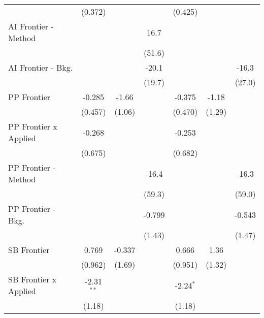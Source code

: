 \begin{tabular}{lcccccc}
                                & (0.372)        &              &              & (0.425)        &              &   \\   
   AI Frontier - Method         &                &              & 16.7         &                &              &   \\   
                                &                &              & (51.6)       &                &              &   \\   
   AI Frontier - Bkg.           &                &              & -20.1        &                &              & -16.3\\   
                                &                &              & (19.7)       &                &              & (27.0)\\   
   PP Frontier                  & -0.285         & -1.66        &              & -0.375         & -1.18        &   \\   
                                & (0.457)        & (1.06)       &              & (0.470)        & (1.29)       &   \\   
   PP Frontier x Applied        & -0.268         &              &              & -0.253         &              &   \\   
                                & (0.675)        &              &              & (0.682)        &              &   \\   
   PP Frontier - Method         &                &              & -16.4        &                &              & -16.3\\   
                                &                &              & (59.3)       &                &              & (59.0)\\   
   PP Frontier - Bkg.           &                &              & -0.799       &                &              & -0.543\\   
                                &                &              & (1.43)       &                &              & (1.47)\\   
   SB Frontier                  & 0.769          & -0.337       &              & 0.666          & 1.36         &   \\   
                                & (0.962)        & (1.69)       &              & (0.951)        & (1.32)       &   \\   
   SB Frontier x Applied        & -2.31$^{**}$   &              &              & -2.24$^{*}$    &              &   \\   
                                & (1.18)         &              &              & (1.18)         &              &   \\   

\end{tabular}
